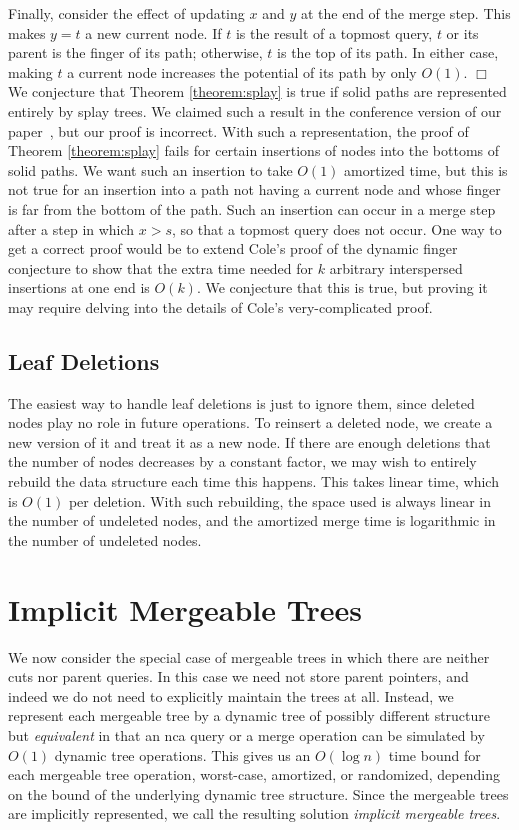 \documentclass[twoside,leqno,twocolumn]{article}
\newcommand{\proofend}{$\Box$\\}
\begin{document}
Finally, consider the effect of updating $x$ and $y$ at the end of the merge step.  This makes $y = t$ a new current node.  If $t$ is the result of a topmost query, $t$ or its parent is the finger of its path; otherwise, $t$ is the top of its path.  In either case, making $t$ a current node increases the potential of its path by only $O(1)$.  \proofend

We conjecture that Theorem \ref{theorem:splay} is true if solid paths are represented entirely by splay trees.  We claimed such a result in the conference version of our paper~\cite{GTW06}, but our proof is incorrect.  With such a representation, the proof of Theorem \ref{theorem:splay} fails for certain insertions of nodes into the bottoms of solid paths.  We want such an insertion to take $O(1)$ amortized time, but this is not true for an insertion into a path not having a current node and whose finger is far from the bottom of the path.  Such an insertion can occur in a merge step after a step in which $x > s$, so that a topmost query does not occur.  One way to get a correct proof would be to extend Cole's proof of the dynamic finger conjecture to show that the extra time needed for $k$ arbitrary interspersed insertions at one end is $O(k)$.  We conjecture that this is true, but proving it may require delving into the details of Cole's very-complicated proof.


\subsection{Leaf Deletions}
\label{sec:deletions}

The easiest way to handle leaf deletions is just to ignore them, since deleted nodes play no role in future operations.  To reinsert a deleted node, we create a new version of it and treat it as a new node.  If there are enough deletions that the number of nodes decreases by a constant factor,  we may wish to entirely rebuild the data structure each time this happens.  This takes linear time, which is $O(1)$ per deletion.  With such rebuilding, the space used is always linear in the number of undeleted nodes, and the amortized merge time is logarithmic in the number of undeleted nodes.


\section{Implicit Mergeable Trees}
\label{sec:weak}

We now consider the special case of mergeable trees in which there are neither cuts nor parent queries.  In this case we need not store parent pointers, and indeed we do not need to explicitly maintain the trees at all.  Instead, we represent each mergeable tree by a dynamic tree of possibly different structure but \emph{equivalent} in that an nca query or a merge operation can be simulated by $O(1)$ dynamic tree operations.  This gives us an $O(\log n)$ time bound for each mergeable tree operation, worst-case, amortized, or randomized, depending on the bound of the underlying dynamic tree structure.  Since the mergeable trees are implicitly represented, we call the resulting solution \emph{implicit mergeable trees}.
\end{document}
